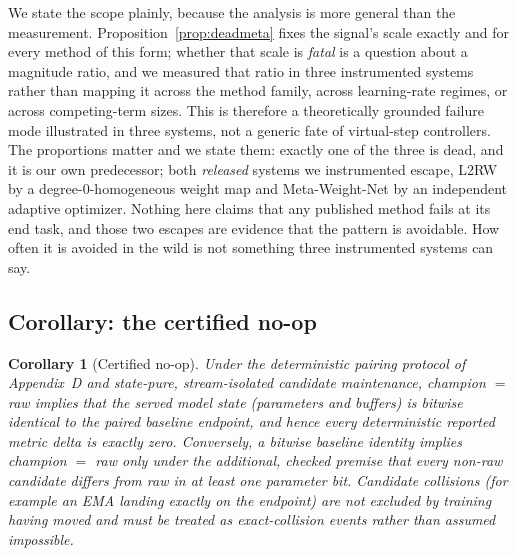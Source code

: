 \documentclass[10pt,letterpaper]{article}
\newtheorem{corollary}{Corollary}
\theoremstyle{remark}
\begin{document}
We state the scope plainly, because the analysis is more general than the
measurement. Proposition~\ref{prop:deadmeta} fixes the signal's scale exactly
and for every method of this form; whether that scale is \emph{fatal} is a
question about a magnitude ratio, and we measured that ratio in three
instrumented systems rather than mapping it across the method family, across
learning-rate regimes, or across competing-term sizes. This is therefore a
theoretically grounded failure mode illustrated in three systems, not a generic
fate of virtual-step controllers. The proportions matter and we state them:
exactly one of the three is dead, and it is our own predecessor; both
\emph{released} systems we instrumented escape, L2RW by a
degree-0-homogeneous weight map and Meta-Weight-Net by an independent adaptive
optimizer. Nothing here claims that any published method fails at its end task,
and those two escapes are evidence that the pattern is avoidable. How often it
is avoided in the wild is not something three instrumented systems can say.

\subsection{Corollary: the certified no-op}

\begin{corollary}[Certified no-op]
\label{cor:noop}
Under the deterministic pairing protocol of Appendix~D and state-pure,
stream-isolated candidate maintenance, champion $=$ raw implies that the
served model state (parameters and buffers) is bitwise identical to the
paired baseline endpoint, and hence every deterministic reported metric
delta is exactly zero. Conversely, a bitwise baseline identity implies
champion $=$ raw only under the additional, checked premise that every
non-raw candidate differs from raw in at least one parameter bit. Candidate
collisions (for example an EMA landing exactly on the endpoint) are not
excluded by training having moved and must be treated as exact-collision
events rather than assumed impossible.
\end{corollary}
\end{document}
